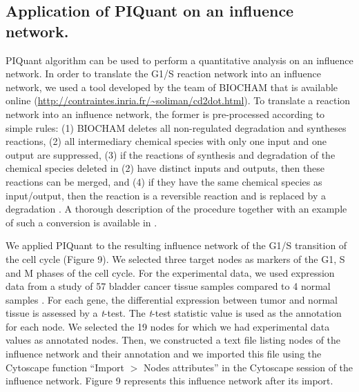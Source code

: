 \documentclass[10pt]{bmc_article}
\newenvironment{bmcformat}{\baselineskip20pt\sloppy\setboolean{publ}{false}}{\baselineskip20pt\sloppy}
\begin{document}
\begin{bmcformat}
\subsection*{Application of PIQuant on an influence network.}
PIQuant algorithm can be used to perform a quantitative analysis on an influence
network. In order to translate the G1/S reaction network into an influence network, we used
a tool developed by the team of BIOCHAM \cite{calzone2006biocham} that is
available online (\url{http://contraintes.inria.fr/~soliman/cd2dot.html}). To
translate a reaction network into an influence network, the former is
pre-processed according to simple rules: (1) BIOCHAM deletes all non-regulated
degradation and syntheses reactions, (2) all intermediary chemical species with
only one input and
one output are suppressed, (3) if the reactions of synthesis and degradation of
the chemical species deleted in (2) have distinct inputs and outputs, then these
reactions
can be merged, and (4) if they have the same chemical species as input/output,
then the reaction is a
reversible reaction and is replaced by a degradation \cite{fages2008frontiers}.
A thorough description of the procedure together with an example of such a
conversion is
available in \cite{calzone2011calamar}.

We applied PIQuant to the resulting influence network of the G1/S transition of
the cell cycle (Figure 9). We selected three target nodes as
markers of the G1, S and M
phases of the cell cycle. For the experimental data, we used expression data
from a study of 57 bladder cancer
tissue samples compared to 4 normal samples \cite{stransky2006regional}. For
each gene, the differential expression between tumor and normal tissue
is assessed by a \textit{t}-test. The \textit{t}-test statistic value is used as the annotation
for each node. We selected the 19 nodes for which we had experimental data
values as annotated nodes. Then, we constructed a text file listing nodes of the influence network
and their annotation and we imported this file using the Cytoscape function
``Import $>$ Nodes attributes''
in the Cytoscape session of the influence network.
Figure 9 represents this influence network after its import.



\end{bmcformat}
\end{document}
